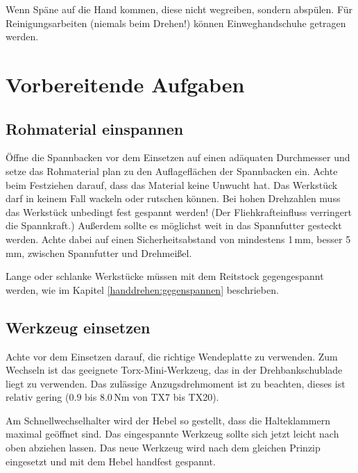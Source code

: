 \documentclass{\basedir/fablab-document}
\begin{document}
Wenn Späne auf die Hand kommen, diese nicht wegreiben, sondern abspülen. Für Reinigungsarbeiten (niemals beim Drehen!) können Einweghandschuhe getragen werden.




\section{Vorbereitende Aufgaben}
\subsection{Rohmaterial einspannen}

Öffne die Spannbacken vor dem Einsetzen auf einen adäquaten Durchmesser und setze das Rohmaterial
plan zu den Auflageflächen der Spannbacken ein.
Achte beim Festziehen darauf, dass das Material keine Unwucht hat.
Das Werkstück darf in keinem Fall wackeln oder rutschen können.
Bei hohen Drehzahlen muss das Werkstück unbedingt fest gespannt werden!
(Der Fliehkrafteinfluss verringert die Spannkraft.)
Außerdem sollte es möglichst weit in das Spannfutter gesteckt werden.
Achte dabei auf einen Sicherheitsabstand von mindestens 1\,mm, besser 5\,mm, zwischen Spannfutter und Drehmeißel.

Lange oder schlanke Werkstücke müssen mit dem Reitstock gegengespannt werden,
wie im Kapitel \ref{handdrehen:gegenspannen} beschrieben.

\subsection{Werkzeug einsetzen} %
Achte vor dem Einsetzen darauf, die richtige Wendeplatte zu verwenden. Zum Wechseln ist das geeignete Torx-Mini-Werkzeug, das in der Drehbankschublade liegt zu verwenden. Das zulässige Anzugsdrehmoment ist zu beachten, dieses ist relativ gering ($0.9$ bis $8.0$\,Nm von TX7 bis TX20).

Am Schnellwechselhalter wird der Hebel so gestellt, dass die Halteklammern maximal geöffnet sind.
Das eingespannte Werkzeug sollte sich jetzt leicht nach oben abziehen lassen.
Das neue Werkzeug wird nach dem gleichen Prinzip eingesetzt und mit dem Hebel handfest gespannt.
\end{document}
